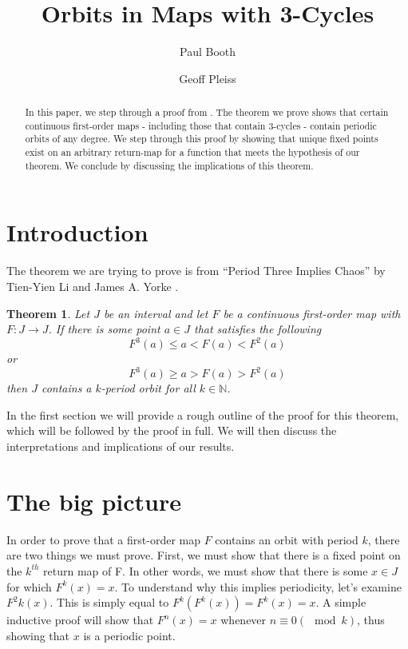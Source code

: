 \documentclass[12pt]{IEEEtran}
\title{Orbits in Maps with 3-Cycles}
\author{
  Paul Booth \\
  \and
  Geoff Pleiss
}
\date{}
\newtheorem{thm}{Theorem}
\begin{document}
  \maketitle


\begin{abstract}
In this paper, we step through a proof from \cite{li}. The theorem we prove shows that certain continuous first-order maps - including those that contain 3-cycles - contain periodic orbits of any degree. We step through this proof by showing that unique fixed points exist on an arbitrary return-map for a function that meets the hypothesis of our theorem. We conclude by discussing the implications of this theorem.
\end{abstract}


\section{Introduction}

The theorem we are trying to prove is from ``Period Three Implies Chaos'' by Tien-Yien Li and James A. Yorke \cite{li}.

\begin{thm}
\label{thm:mainthm}
	Let $J$ be an interval and let $F$ be a continuous first-order map with $F : J \rightarrow J$. If there is some point $a \in J$ that satisfies the following
	\[ F^3\left(a\right) \leq a < F\left(a\right) < F^2\left(a\right) \]
	or
	\[ F^3\left(a\right) \geq a > F\left(a\right) > F^2\left(a\right) \]
	then $J$ contains a $k$-period orbit for all $k \in \mathbb{N}$.
\end{thm}

In the first section we will provide a rough outline of the proof for this theorem, which will be followed by the proof in full. We will then discuss the interpretations and implications of our results.



\section{The big picture}
\label{stc:thebigpic}

In order to prove that a first-order map $F$ contains an orbit with period $k$, there are two things we must prove. First, we must show that there is a fixed point on the $k^{th}$ return map of F. In other words, we must show that there is some $x \in J$ for which $F^k \left( x \right) = x$. To understand why this implies periodicity, let's examine $F^2k \left( x \right)$. This is simply equal to $F^k \left( F^k \left( x \right) \right) = F^k \left( x \right) = x$. A simple inductive proof will show that $F^n \left( x \right) = x$ whenever $n \equiv 0 \left(\mod k \right)$, thus showing that $x$ is a periodic point.
\end{document}
